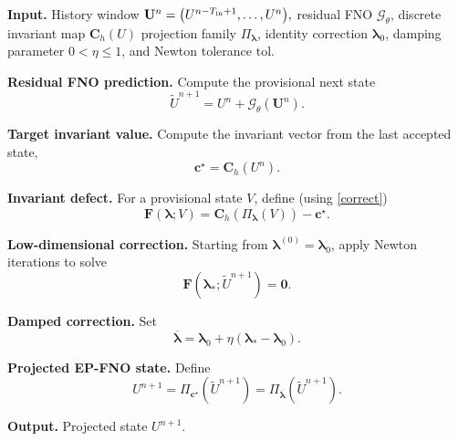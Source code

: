 \documentclass[11pt,a4paper]{article}
\theoremstyle{definition}
\theoremstyle{remark}
\numberwithin{equation}{section}
\numberwithin{figure}{section}
\numberwithin{table}{section}
\begin{document}
\begin{algorithm}[htpb]
\caption{EP-FNO with damped invariant projection algorithm}
\label{alg:epfno_projection}
\begin{algorithmic}[1]

\State \textbf{Input.} History window $ \mathbf U^n = \bigl( U^{n-T_{\rm in}+1},\ldots,U^n\bigr),$ residual FNO \(\mathcal G_\theta\), discrete invariant map $ \mathbf C_h(U)$ projection family \(\Pi_{\boldsymbol\lambda}\), identity correction
\(\boldsymbol\lambda_0\), damping parameter \(0<\eta\le 1\), and Newton
tolerance \(\mathrm{tol}\).

\State \textbf{Residual FNO prediction.}
Compute the provisional next state
\[
    \widetilde U^{n+1}
    =
    U^n+\mathcal G_\theta(\mathbf U^n).
\]

\State \textbf{Target invariant value.}
Compute the invariant vector from the last accepted state,
\[
    \mathbf c^\star
    =
    \mathbf C_h(U^n).
\]

\State \textbf{Invariant defect.}
For a provisional state \(V\), define (using \eqref{correct})
\[
    \mathbf F(\boldsymbol\lambda;V)
    =
    \mathbf C_h\!\left(
    \Pi_{\boldsymbol\lambda}(V)
    \right)
    -
    \mathbf c^\star .
\]

\State \textbf{Low-dimensional correction.}
Starting from \(\boldsymbol\lambda^{(0)}=\boldsymbol\lambda_0\), apply Newton
iterations to solve
\[
    \mathbf F(\boldsymbol\lambda_\ast;\widetilde U^{n+1})
    =
    \mathbf 0.
\]

\State \textbf{Damped correction.}
Set
\[
    \overline{\boldsymbol\lambda}
    =
    \boldsymbol\lambda_0
    +
    \eta
    \left(
    \boldsymbol\lambda_\ast-\boldsymbol\lambda_0
    \right).
\]

\State \textbf{Projected EP-FNO state.}
Define
\[
    U^{n+1}
    =
    \Pi_{\mathbf c^\star}(\widetilde U^{n+1})
    =
    \Pi_{\overline{\boldsymbol\lambda}}
    (\widetilde U^{n+1}).
\]

\State \textbf{Output.} Projected state \(U^{n+1}\).

\end{algorithmic}
\end{algorithm}
\end{document}
